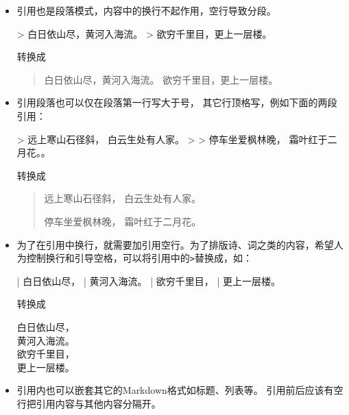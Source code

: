 \documentclass[]{ctexbook}
\newenvironment{Shaded}{\begin{snugshade}}{\end{snugshade}}
\newcommand{\AttributeTok}[1]{\textcolor[rgb]{0.77,0.63,0.00}{#1}}
\newcommand{\NormalTok}[1]{#1}
\begin{document}
\begin{itemize}
\item
  引用也是段落模式，内容中的换行不起作用，空行导致分段。

\begin{Shaded}
\begin{Highlighting}[]
\AttributeTok{\textgreater{} 白日依山尽，黄河入海流。}
\AttributeTok{\textgreater{} 欲穷千里目，更上一层楼。}
\end{Highlighting}
\end{Shaded}

  转换成

  \begin{quote}
  白日依山尽，黄河入海流。
  欲穷千里目，更上一层楼。
  \end{quote}
\item
  引用段落也可以仅在段落第一行写大于号， 其它行顶格写，例如下面的两段引用：

\begin{Shaded}
\begin{Highlighting}[]
\AttributeTok{\textgreater{} 远上寒山石径斜，}
\AttributeTok{白云生处有人家。}
\AttributeTok{\textgreater{}}
\AttributeTok{\textgreater{} 停车坐爱枫林晚，}
\AttributeTok{霜叶红于二月花。。}
\end{Highlighting}
\end{Shaded}

  转换成

  \begin{quote}
  远上寒山石径斜，
  白云生处有人家。

  停车坐爱枫林晚，
  霜叶红于二月花。
  \end{quote}
\item
  为了在引用中换行，就需要加引用空行。为了排版诗、词之类的内容，希望人为控制换行和引导空格，可以将引用中的\texttt{\textgreater{}}替换成\texttt{\textbar{}}，如：

\begin{Shaded}
\begin{Highlighting}[]
\NormalTok{| 白日依山尽，}
\NormalTok{| 黄河入海流。}
\NormalTok{| 欲穷千里目，}
\NormalTok{| 更上一层楼。}
\end{Highlighting}
\end{Shaded}

  转换成

  白日依山尽，\\
  黄河入海流。\\
  欲穷千里目，\\
  更上一层楼。
\item
  引用内也可以嵌套其它的Markdown格式如标题、列表等。 引用前后应该有空行把引用内容与其他内容分隔开。


\end{itemize}
\end{document}
